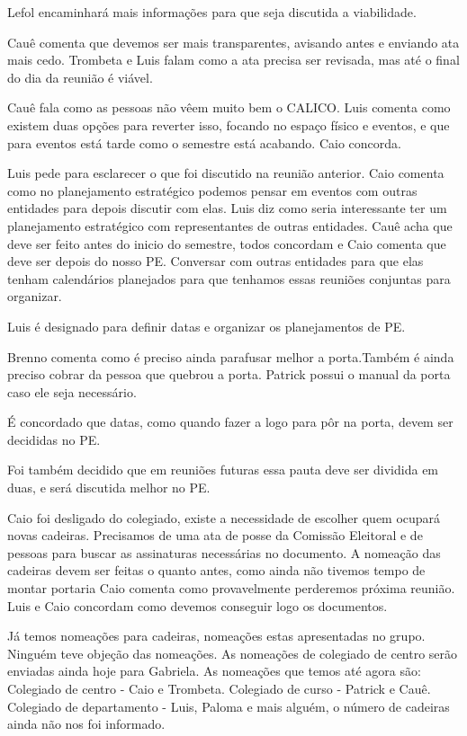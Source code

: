 \documentclass{ata-calico}
\begin{document}
Lefol encaminhará mais informações para que seja discutida a viabilidade.


Cauê comenta que devemos ser mais transparentes, avisando antes e enviando ata mais cedo. Trombeta e Luis falam como a ata precisa ser revisada, mas até o final do dia da reunião é viável.

Cauê fala como as pessoas não vêem muito bem o CALICO. Luis comenta como existem duas opções para reverter isso, focando no espaço físico e eventos, e que para eventos está tarde como o semestre está acabando. Caio concorda.

Luis pede para esclarecer o que foi discutido na reunião anterior. Caio comenta como no planejamento estratégico podemos pensar em eventos com outras entidades para depois discutir com elas. Luis diz como seria interessante ter um planejamento estratégico com representantes de outras entidades. Cauê acha que deve ser feito antes do inicio do semestre, todos concordam e Caio comenta que deve ser depois do nosso PE. Conversar com outras entidades para que elas tenham calendários planejados para que tenhamos essas reuniões conjuntas para organizar.

Luis é designado para definir datas e organizar os planejamentos de PE. 

Brenno comenta como é preciso ainda parafusar melhor a porta.Também é ainda preciso cobrar da pessoa que quebrou a porta. Patrick possui o manual da porta caso ele seja necessário.

É concordado que datas, como quando fazer a logo para pôr na porta, devem ser decididas no PE.

Foi também decidido que em reuniões futuras essa pauta deve ser dividida em duas, e será discutida melhor no PE.


Caio foi desligado do colegiado, existe a necessidade de escolher quem ocupará novas cadeiras. Precisamos de uma ata de posse da Comissão Eleitoral e de pessoas para buscar as assinaturas necessárias no documento. A nomeação das cadeiras devem ser feitas o quanto antes, como ainda não tivemos tempo de montar portaria Caio comenta como provavelmente perderemos próxima reunião. Luis e Caio concordam como devemos conseguir logo os documentos.

Já temos nomeações para cadeiras, nomeações estas apresentadas no grupo. Ninguém teve objeção das nomeações. As nomeações de colegiado de centro serão enviadas ainda hoje para Gabriela. As nomeações que temos até agora são: Colegiado de centro - Caio e Trombeta. Colegiado de curso - Patrick e Cauê. Colegiado de departamento - Luis, Paloma e mais alguém, o número de cadeiras ainda não nos foi informado. 
\end{document}

